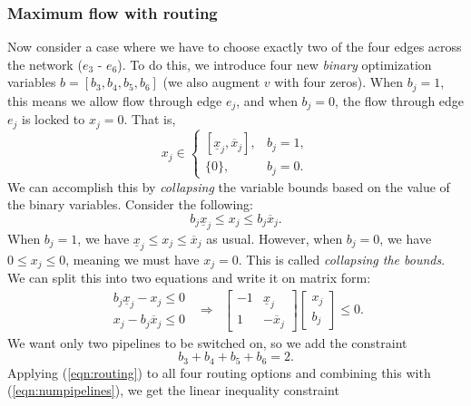 \subsubsection{Maximum flow with routing} \label{sec:maxflowrouting}
Now consider a case where we have to choose exactly two of the four edges across the network ($e_3$ - $e_6$). To do this, we introduce four new \emph{binary} optimization variables $b = [b_3,b_4,b_5,b_6]$ (we also augment $v$ with four zeros). When $b_j=1$, this means we allow flow through edge $e_j$, and when $b_j=0$, the flow through edge $e_j$ is locked to $x_j=0$. That is,
\[
x_j \in \left \lbrace \begin{array}{ll} [\underline{x}_j, \overline{x}_j], & b_j = 1, \\ \lbrace 0 \rbrace, & b_j = 0. \end{array} \right. 
\]
We can accomplish this by \emph{collapsing} the variable bounds based on the value of the binary variables. Consider the following:
\[
b_j\underline{x}_j \leq x_j \leq b_j\overline{x}_j.
\]
When $b_j = 1$, we have $\underline{x}_j \leq x_j \leq \overline{x}_j$ as usual. However, when $b_j = 0$, we have $0 \leq x_j \leq 0$, meaning we must have $x_j = 0$. This is called \emph{collapsing the bounds}. We can split this into two equations and write it on matrix form:
\begin{equation}
\begin{array}{rcl}
\begin{array}{r}
b_j \underline{x}_j - x_j \leq 0 \\
x_j - b_j \overline{x}_j \leq 0
\end{array}
&
\Rightarrow
&
\begin{bmatrix}
-1 & \underline{x}_j \\
1 & -\overline{x}_j
\end{bmatrix}
\begin{bmatrix} x_j \\ b_j \end{bmatrix}
\leq 0.
\end{array}
\label{eqn:routing}
\end{equation}
We want only two pipelines to be switched on, so we add the constraint
\begin{equation}
b_3 + b_4 + b_5 + b_6 = 2.
\label{eqn:numpipelines}
\end{equation}
Applying (\ref{eqn:routing}) to all four routing options and combining this with (\ref{eqn:numpipelines}), we get the linear inequality constraint

